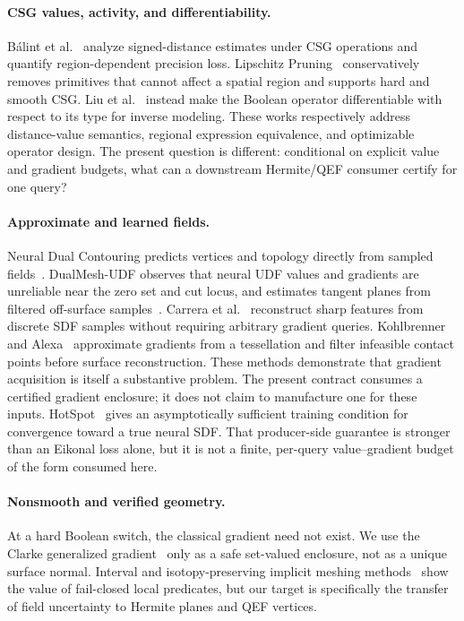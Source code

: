 \documentclass[11pt]{article}
\theoremstyle{definition}
\begin{document}
\paragraph{CSG values, activity, and differentiability.}
B\'alint et al.~\cite{balint2023sdfe} analyze signed-distance estimates under
CSG operations and quantify region-dependent precision loss.  Lipschitz
Pruning~\cite{barbier2025pruning} conservatively removes primitives that cannot
affect a spatial region and supports hard and smooth CSG.  Liu et
al.~\cite{liu2024fuzzy} instead make the Boolean operator differentiable with
respect to its type for inverse modeling.  These works respectively address
distance-value semantics, regional expression equivalence, and optimizable
operator design.  The present question is different: conditional on explicit
value and gradient budgets, what can a downstream Hermite/QEF consumer certify
for one query?

\paragraph{Approximate and learned fields.}
Neural Dual Contouring predicts vertices and topology directly from sampled
fields~\cite{chen2022ndc}.  DualMesh-UDF observes that neural UDF values and
gradients are unreliable near the zero set and cut locus, and estimates tangent
planes from filtered off-surface samples~\cite{zhang2023udf}.  Carrera et
al.~\cite{carrera2026dual} reconstruct sharp features from discrete SDF samples
without requiring arbitrary gradient queries.  Kohlbrenner and
Alexa~\cite{kohlbrenner2026gradients} approximate gradients from a tessellation
and filter infeasible contact points before surface reconstruction.  These
methods demonstrate that gradient acquisition is itself a substantive problem.
The present contract consumes a certified gradient enclosure; it does not
claim to manufacture one for these inputs.
HotSpot~\cite{wang2025hotspot} gives an asymptotically sufficient training
condition for convergence toward a true neural SDF.  That producer-side
guarantee is stronger than an Eikonal loss alone, but it is not a finite,
per-query value--gradient budget of the form consumed here.

\paragraph{Nonsmooth and verified geometry.}
At a hard Boolean switch, the classical gradient need not exist.  We use the
Clarke generalized gradient~\cite{clarke1990optimization} only as a safe
set-valued enclosure, not as a unique surface normal.  Interval and
isotopy-preserving implicit meshing methods~\cite{plantinga2004isotopic} show
the value of fail-closed local predicates, but our target is specifically the
transfer of field uncertainty to Hermite planes and QEF vertices.
\end{document}

